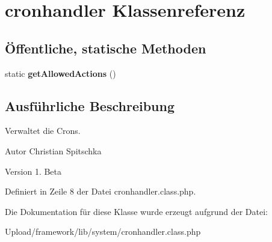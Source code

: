 \hypertarget{classcronhandler}{}\section{cronhandler Klassenreferenz}
\label{classcronhandler}
\subsection*{Öffentliche, statische Methoden}
\begin{DoxyCompactItemize}
\item 
\mbox{\label{classcronhandler_affb04cc20a653d2bde41e6c33df2b79c}} 
static {\bfseries get\+Allowed\+Actions} ()
\end{DoxyCompactItemize}


\subsection{Ausführliche Beschreibung}
Verwaltet die Crons. \begin{DoxyAuthor}{Autor}
Christian Spitschka 
\end{DoxyAuthor}
\begin{DoxyVersion}{Version}
1. Beta 
\end{DoxyVersion}


Definiert in Zeile 8 der Datei cronhandler.\+class.\+php.



Die Dokumentation für diese Klasse wurde erzeugt aufgrund der Datei\+:\begin{DoxyCompactItemize}
\item 
Upload/framework/lib/system/cronhandler.\+class.\+php\end{DoxyCompactItemize}
